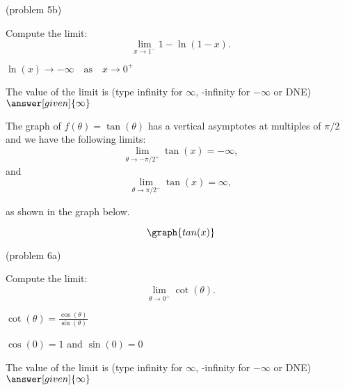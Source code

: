 \documentclass{ximera}
\begin{document}
\begin{problem}(problem 5b)
  
	Compute the limit:
  \[
  \lim_{x \to {1^-}} 1 - \ln(1-x).
  \]
		\begin{hint}
		  $\ln(x) \to -\infty \quad \text{as} \quad x \to 0^+$
		\end{hint}	
		The value of the limit is
		(type infinity for $\infty$, -infinity for $-\infty$ or DNE)
		 $\answer[given]{\infty}$
		
\end{problem}

\begin{example}[example 6]
The graph of $f(\theta) = \tan(\theta)$ has a vertical asymptotes at multiples of $\pi/2$ and
we have the following limits: 
\[
\lim_{\theta\to -\pi/2^+} \tan(x) = -\infty,
\]
and
\[
\lim_{\theta\to \pi/2^-} \tan(x) = \infty,
\]

as shown in the graph below.
		
			
\[
\graph{tan(x)}
\]
\end{example}

\begin{problem}(problem 6a)
  
	Compute the limit:
  \[
  \lim_{\theta \to {0^+}} \cot(\theta).
  \]
		\begin{hint}
		  $\cot(\theta) = \frac{\cos(\theta)}{\sin(\theta)}$
		\end{hint}	
		\begin{hint}
		  $\cos(0) = 1$ and $\sin(0) = 0$
		\end{hint}
		
		The value of the limit is
		(type infinity for $\infty$, -infinity for $-\infty$ or DNE)
		 $\answer[given]{\infty}$
		
\end{problem}
\end{document}
